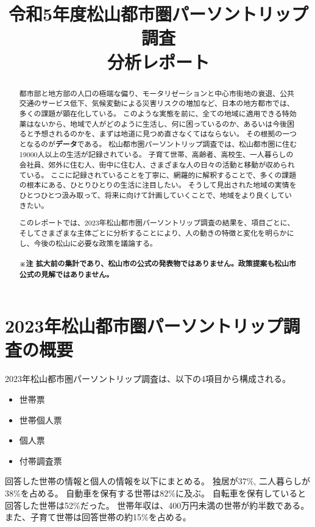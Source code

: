 \documentclass[a4paper,12pt, uplatex]{jsbook}
\title{令和5年度松山都市圏パーソントリップ調査\\分析レポート
\vspace{10cm}}
\date{}
\begin{document}
\maketitle
\begin{abstract}
  都市部と地方部の人口の極端な偏り、モータリゼーションと中心市街地の衰退、公共交通のサービス低下、気候変動による災害リスクの増加など、日本の地方都市では、多くの課題が顕在化している。
  このような実態を前に、全ての地域に適用できる特効薬はないから、地域で人がどのように生活し、何に困っているのか、あるいは今後困ると予想されるのかを、まずは地道に見つめ直さなくてはならない。
  その根拠の一つとなるのが\textbf{データ}である。
  松山都市圏パーソントリップ調査では、松山都市圏に住む19000人以上の生活が記録されている。
  子育て世帯、高齢者、高校生、一人暮らしの会社員、郊外に住む人、街中に住む人、さまざまな人の日々の活動と移動が収められている。
  ここに記録されていることを丁寧に、網羅的に解釈することで、多くの課題の根本にある、ひとりひとりの生活に注目したい。
  そうして見出された地域の実情をひとつひとつ汲み取って、将来に向けて計画していくことで、地域をより良くしていきたい。

  このレポートでは、2023年松山都市圏パーソントリップ調査の結果を、項目ごとに、そしてさまざまな主体ごとに分析することにより、人の動きの特徴と変化を明らかにし、今後の松山に必要な政策を議論する。
  \\
  \\
  \color{red}
  \textbf{※注 拡大前の集計であり、松山市の公式の発表物ではありません。政策提案も松山市公式の見解ではありません。}
  \color{black}
\end{abstract}

\tableofcontents


\chapter{2023年松山都市圏パーソントリップ調査の概要}
2023年松山都市圏パーソントリップ調査は、以下の4項目から構成される。
\begin{itemize}
  \item 世帯票
  \item 世帯個人票
  \item 個人票
  \item 付帯調査票
\end{itemize}

回答した世帯の情報と個人の情報を以下にまとめる。
独居が37\%, 二人暮らしが38\%を占める。
自動車を保有する世帯は82\%に及ぶ。
自転車を保有していると回答した世帯は52\%だった。
世帯年収は、400万円未満の世帯が約半数である。
また、子育て世帯は回答世帯の約15\%を占める。
\end{document}
